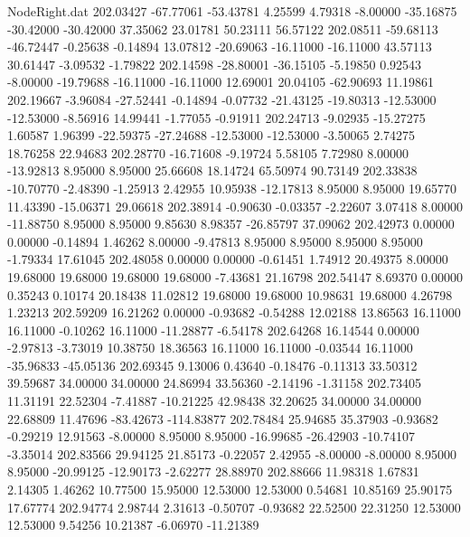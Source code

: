 \begin{filecontents}{NodeRight.dat}
 202.03427  -67.77061  -53.43781     4.25599    4.79318   -8.00000  -35.16875  -30.42000  -30.42000   37.35062   23.01781   50.23111   56.57122
 202.08511  -59.68113  -46.72447    -0.25638   -0.14894   13.07812  -20.69063  -16.11000  -16.11000   43.57113   30.61447   -3.09532   -1.79822
 202.14598  -28.80001  -36.15105    -5.19850    0.92543   -8.00000  -19.79688  -16.11000  -16.11000   12.69001   20.04105  -62.90693   11.19861
 202.19667   -3.96084  -27.52441    -0.14894   -0.07732  -21.43125  -19.80313  -12.53000  -12.53000   -8.56916   14.99441   -1.77055   -0.91911
 202.24713   -9.02935  -15.27275     1.60587    1.96399  -22.59375  -27.24688  -12.53000  -12.53000   -3.50065    2.74275   18.76258   22.94683
 202.28770  -16.71608   -9.19724     5.58105    7.72980    8.00000  -13.92813    8.95000    8.95000   25.66608   18.14724   65.50974   90.73149
 202.33838  -10.70770   -2.48390    -1.25913    2.42955   10.95938  -12.17813    8.95000    8.95000   19.65770   11.43390  -15.06371   29.06618
 202.38914   -0.90630   -0.03357    -2.22607    3.07418    8.00000  -11.88750    8.95000    8.95000    9.85630    8.98357  -26.85797   37.09062
 202.42973    0.00000    0.00000    -0.14894    1.46262    8.00000   -9.47813    8.95000    8.95000    8.95000    8.95000   -1.79334   17.61045
 202.48058    0.00000    0.00000    -0.61451    1.74912   20.49375    8.00000   19.68000   19.68000   19.68000   19.68000   -7.43681   21.16798
 202.54147    8.69370    0.00000     0.35243    0.10174   20.18438   11.02812   19.68000   19.68000   10.98631   19.68000    4.26798    1.23213
 202.59209   16.21262    0.00000    -0.93682   -0.54288   12.02188   13.86563   16.11000   16.11000   -0.10262   16.11000  -11.28877   -6.54178
 202.64268   16.14544    0.00000    -2.97813   -3.73019   10.38750   18.36563   16.11000   16.11000   -0.03544   16.11000  -35.96833  -45.05136
 202.69345    9.13006    0.43640    -0.18476   -0.11313   33.50312   39.59687   34.00000   34.00000   24.86994   33.56360   -2.14196   -1.31158
 202.73405   11.31191   22.52304    -7.41887  -10.21225   42.98438   32.20625   34.00000   34.00000   22.68809   11.47696  -83.42673 -114.83877
 202.78484   25.94685   35.37903    -0.93682   -0.29219   12.91563   -8.00000    8.95000    8.95000  -16.99685  -26.42903  -10.74107   -3.35014
 202.83566   29.94125   21.85173    -0.22057    2.42955   -8.00000   -8.00000    8.95000    8.95000  -20.99125  -12.90173   -2.62277   28.88970
 202.88666   11.98318    1.67831     2.14305    1.46262   10.77500   15.95000   12.53000   12.53000    0.54681   10.85169   25.90175   17.67774
 202.94774    2.98744    2.31613    -0.50707   -0.93682   22.52500   22.31250   12.53000   12.53000    9.54256   10.21387   -6.06970  -11.21389

\end{filecontents}
